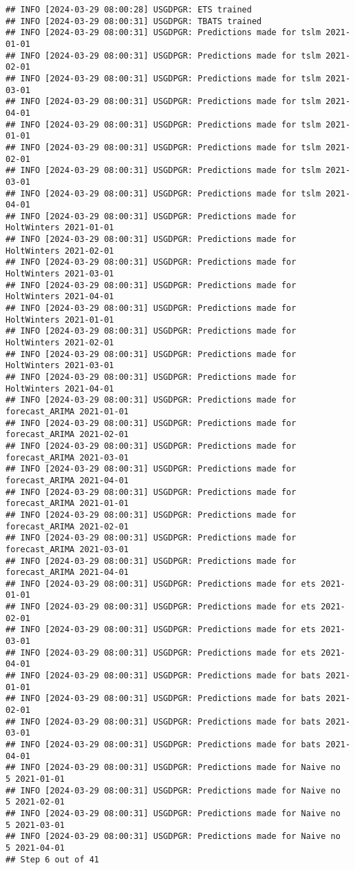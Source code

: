 \documentclass[
]{article}
\begin{document}
\begin{verbatim}
## INFO [2024-03-29 08:00:28] USGDPGR: ETS trained
## INFO [2024-03-29 08:00:31] USGDPGR: TBATS trained
## INFO [2024-03-29 08:00:31] USGDPGR: Predictions made for tslm 2021-01-01
## INFO [2024-03-29 08:00:31] USGDPGR: Predictions made for tslm 2021-02-01
## INFO [2024-03-29 08:00:31] USGDPGR: Predictions made for tslm 2021-03-01
## INFO [2024-03-29 08:00:31] USGDPGR: Predictions made for tslm 2021-04-01
## INFO [2024-03-29 08:00:31] USGDPGR: Predictions made for tslm 2021-01-01
## INFO [2024-03-29 08:00:31] USGDPGR: Predictions made for tslm 2021-02-01
## INFO [2024-03-29 08:00:31] USGDPGR: Predictions made for tslm 2021-03-01
## INFO [2024-03-29 08:00:31] USGDPGR: Predictions made for tslm 2021-04-01
## INFO [2024-03-29 08:00:31] USGDPGR: Predictions made for HoltWinters 2021-01-01
## INFO [2024-03-29 08:00:31] USGDPGR: Predictions made for HoltWinters 2021-02-01
## INFO [2024-03-29 08:00:31] USGDPGR: Predictions made for HoltWinters 2021-03-01
## INFO [2024-03-29 08:00:31] USGDPGR: Predictions made for HoltWinters 2021-04-01
## INFO [2024-03-29 08:00:31] USGDPGR: Predictions made for HoltWinters 2021-01-01
## INFO [2024-03-29 08:00:31] USGDPGR: Predictions made for HoltWinters 2021-02-01
## INFO [2024-03-29 08:00:31] USGDPGR: Predictions made for HoltWinters 2021-03-01
## INFO [2024-03-29 08:00:31] USGDPGR: Predictions made for HoltWinters 2021-04-01
## INFO [2024-03-29 08:00:31] USGDPGR: Predictions made for forecast_ARIMA 2021-01-01
## INFO [2024-03-29 08:00:31] USGDPGR: Predictions made for forecast_ARIMA 2021-02-01
## INFO [2024-03-29 08:00:31] USGDPGR: Predictions made for forecast_ARIMA 2021-03-01
## INFO [2024-03-29 08:00:31] USGDPGR: Predictions made for forecast_ARIMA 2021-04-01
## INFO [2024-03-29 08:00:31] USGDPGR: Predictions made for forecast_ARIMA 2021-01-01
## INFO [2024-03-29 08:00:31] USGDPGR: Predictions made for forecast_ARIMA 2021-02-01
## INFO [2024-03-29 08:00:31] USGDPGR: Predictions made for forecast_ARIMA 2021-03-01
## INFO [2024-03-29 08:00:31] USGDPGR: Predictions made for forecast_ARIMA 2021-04-01
## INFO [2024-03-29 08:00:31] USGDPGR: Predictions made for ets 2021-01-01
## INFO [2024-03-29 08:00:31] USGDPGR: Predictions made for ets 2021-02-01
## INFO [2024-03-29 08:00:31] USGDPGR: Predictions made for ets 2021-03-01
## INFO [2024-03-29 08:00:31] USGDPGR: Predictions made for ets 2021-04-01
## INFO [2024-03-29 08:00:31] USGDPGR: Predictions made for bats 2021-01-01
## INFO [2024-03-29 08:00:31] USGDPGR: Predictions made for bats 2021-02-01
## INFO [2024-03-29 08:00:31] USGDPGR: Predictions made for bats 2021-03-01
## INFO [2024-03-29 08:00:31] USGDPGR: Predictions made for bats 2021-04-01
## INFO [2024-03-29 08:00:31] USGDPGR: Predictions made for Naive no  5 2021-01-01
## INFO [2024-03-29 08:00:31] USGDPGR: Predictions made for Naive no  5 2021-02-01
## INFO [2024-03-29 08:00:31] USGDPGR: Predictions made for Naive no  5 2021-03-01
## INFO [2024-03-29 08:00:31] USGDPGR: Predictions made for Naive no  5 2021-04-01
## Step 6 out of 41
\end{verbatim}
\end{document}
